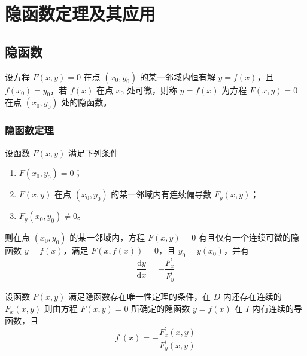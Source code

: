 \chapter{隐函数定理及其应用}

\section{隐函数}

\begin{definition}
    设方程 $F(x,y)=0$ 在点 $(x_0,y_0)$ 的某一邻域内恒有解 $y=f(x)$，且 $f(x_0)=y_0$，若 $f(x)$ 在点 $x_0$ 处可微，则称 $y=f(x)$ 为方程 $F(x,y)=0$ 在点 $(x_0,y_0)$ 处的隐函数。
\end{definition}

\subsection{隐函数定理}

\begin{theorem}[隐函数存在唯一性定理]
    设函数 $F(x,y)$ 满足下列条件
    \begin{enumerate}
        \item $F(x_0,y_0)=0$；
        \item $F(x,y)$ 在点 $(x_0,y_0)$ 的某一邻域内有连续偏导数 $F_{y}(x, y)$；
        \item $F_{y}(x_0,y_0)\neq 0$。
    \end{enumerate}
    则在点 $(x_0,y_0)$ 的某一邻域内，方程 $F(x,y)=0$ 有且仅有一个连续可微的隐函数 $y=f(x)$，满足 $F(x,f(x))=0$，且 $y_0=y(x_0)$，并有
    \begin{equation}
        \frac{\mathrm{d}y}{\mathrm{d}x}=-\frac{F^{\prime}_x}{F^{\prime}_y}
    \end{equation}
\end{theorem}

\begin{theorem}[隐函数可微性定理]
    设函数 $F(x,y)$ 满足隐函数存在唯一性定理的条件，在 $D$ 内还存在连续的 $F_{x}(x, y)$ 则由方程 $F( x, y ) = 0$ 所确定的隐函数 $y = f (x)$ 在 $I$ 内有连续的导函数，且
    \begin{equation}
        f^{\prime}(x)=-\frac{F^{\prime}_x(x,y)}{F^{\prime}_y(x,y)}
    \end{equation}
\end{theorem}


